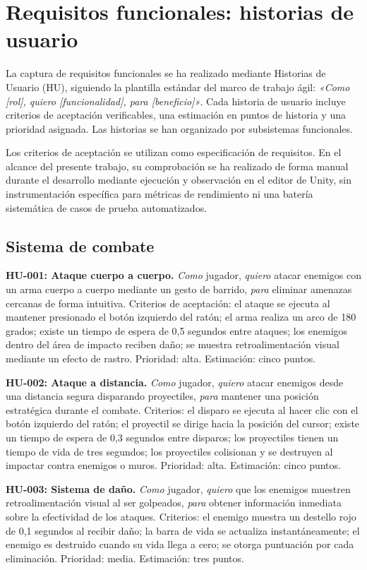 \section{Requisitos funcionales: historias de usuario}


La captura de requisitos funcionales se ha realizado mediante Historias de Usuario (HU), siguiendo la plantilla estándar del marco de trabajo ágil: \textit{«Como [rol], quiero [funcionalidad], para [beneficio]»}. Cada historia de usuario incluye criterios de aceptación verificables, una estimación en puntos de historia y una prioridad asignada. Las historias se han organizado por subsistemas funcionales.

Los criterios de aceptación se utilizan como especificación de requisitos. En el alcance del presente trabajo, su comprobación se ha realizado de forma manual durante el desarrollo mediante ejecución y observación en el editor de Unity, sin instrumentación específica para métricas de rendimiento ni una batería sistemática de casos de prueba automatizados.

\subsection{Sistema de combate}


\textbf{HU-001: Ataque cuerpo a cuerpo.}
\textit{Como} jugador, \textit{quiero} atacar enemigos con un arma cuerpo a cuerpo mediante un gesto de barrido, \textit{para} eliminar amenazas cercanas de forma intuitiva. Criterios de aceptación: el ataque se ejecuta al mantener presionado el botón izquierdo del ratón; el arma realiza un arco de 180 grados; existe un tiempo de espera de 0,5 segundos entre ataques; los enemigos dentro del área de impacto reciben daño; se muestra retroalimentación visual mediante un efecto de rastro. Prioridad: alta. Estimación: cinco puntos.

\textbf{HU-002: Ataque a distancia.}
\textit{Como} jugador, \textit{quiero} atacar enemigos desde una distancia segura disparando proyectiles, \textit{para} mantener una posición estratégica durante el combate. Criterios: el disparo se ejecuta al hacer clic con el botón izquierdo del ratón; el proyectil se dirige hacia la posición del cursor; existe un tiempo de espera de 0,3 segundos entre disparos; los proyectiles tienen un tiempo de vida de tres segundos; los proyectiles colisionan y se destruyen al impactar contra enemigos o muros. Prioridad: alta. Estimación: cinco puntos.

\textbf{HU-003: Sistema de daño.}
\textit{Como} jugador, \textit{quiero} que los enemigos muestren retroalimentación visual al ser golpeados, \textit{para} obtener información inmediata sobre la efectividad de los ataques. Criterios: el enemigo muestra un destello rojo de 0,1 segundos al recibir daño; la barra de vida se actualiza instantáneamente; el enemigo es destruido cuando su vida llega a cero; se otorga puntuación por cada eliminación. Prioridad: media. Estimación: tres puntos.

